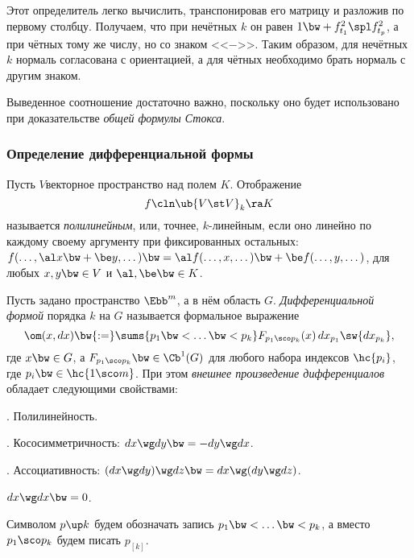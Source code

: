 \documentclass[a4paper]{article}
\newcommand{\pv}[1]{{p_{[#1]}}}
\newcommand{\di}[3]{{d {#1}_{#2_{#3}}}}
\begin{document}
Этот определитель легко вычислить,
транспонировав его матрицу и разложив по первому столбцу.
Получаем, что при нечётных $k$ он равен $1 \bw+ f_{t_1}^2\spl f_{t_p}^2$, а при чётных\т
тому же числу, но со знаком <<$-$>>. Таким образом, для нечётных $k$ нормаль согласована с
ориентацией, а для чётных необходимо брать нормаль с другим знаком.

\begin{note}
\label{orientation.note}
Выведенное соотношение достаточно важно, поскольку оно будет использовано при доказательстве
\emph{общей формулы Стокса}.
\end{note}

\subsubsection{Определение дифференциальной формы}

\begin{df}
Пусть $V$\т векторное пространство над полем $K$. Отображение
$$f\cln \ub{V \st V}_k \ra K$$
называется \emph{полилинейным}, или, точнее, $k$-линейным, если оно линейно по каждому
своему аргументу при фиксированных остальных:
$f(\dots,\al x \bw+ \be y,\dots) \bw= \al f(\dots,x,\dots) \bw+ \be f(\dots,y,\dots)$, для любых
$x,y \bw\in V$ и $\al,\be \bw\in K$.
\end{df}

\begin{df}
Пусть задано пространство $\Ebb^m$, а в нём область $G$. \emph{Дифференциальной формой} порядка
$k$ на $G$ называется формальное выражение
$$
  \om(x,d x) \bw{:=} \sums{p_1 \bw< \dots \bw< p_k} F_{p_1\sco p_k}(x)\,\di xp1 \sw \di xpk,
$$
где $x \bw\in G$, а $F_{p_1\sco p_k} \bw\in \Cb^1(G)$ для любого набора индексов $\hc{p_i}$,
где $p_i \bw\in \hc{1\sco m}$.
При этом \emph{внешнее произведение дифференциалов} обладает следующими свойствами:

. Полилинейность.

. Кососимметричность: $d x \wg d y \bw= -d y \wg d x$.

. Ассоциативность: $(d x \wg d y)\wg d z \bw= d x \wg (d y \wg d z)$.
\end{df}

\begin{imp}
$d x \wg d x \bw= 0$.
\end{imp}

\begin{note}
Символом $p\up k$ будем обозначать запись $p_1 \bw< \dots \bw< p_k$,
а вместо $p_1\sco p_k$ будем писать $\pv k$.
\end{note}
\end{document}
